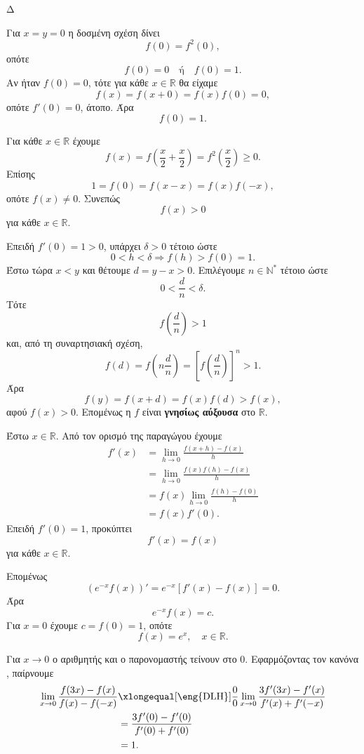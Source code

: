 \begin{thema}{Δ}
\begin{erwthma}
\item Για $x=y=0$ η δοσμένη σχέση δίνει
\[
f(0)=f^2(0),
\]
οπότε
\[
f(0)=0
\quad\text{ή}\quad
f(0)=1.
\]
Αν ήταν $f(0)=0$, τότε για κάθε $x\in\mathbb{R}$ θα είχαμε
\[
f(x)=f(x+0)=f(x)f(0)=0,
\]
οπότε $f'(0)=0$, άτοπο. Άρα
\[
{f(0)=1}.
\]

Για κάθε $x\in\mathbb{R}$ έχουμε
\[
f(x)=f\left(\frac{x}{2}+\frac{x}{2}\right)
=f^2\left(\frac{x}{2}\right)\geq0.
\]
Επίσης
\[
1=f(0)=f(x-x)=f(x)f(-x),
\]
οπότε $f(x)\neq0$. Συνεπώς
\[
{f(x)>0}
\]
για κάθε $x\in\mathbb{R}$.

Επειδή $f'(0)=1>0$, υπάρχει $\delta>0$ τέτοιο ώστε
\[
0<h<\delta\Rightarrow f(h)>f(0)=1.
\]
Έστω τώρα $x<y$ και θέτουμε $d=y-x>0$. Επιλέγουμε $n\in\mathbb{N}^*$ τέτοιο ώστε
\[
0<\frac{d}{n}<\delta.
\]
Τότε
\[
f\left(\frac{d}{n}\right)>1
\]
και, από τη συναρτησιακή σχέση,
\[
f(d)
=f\left(n\frac{d}{n}\right)
=\left[f\left(\frac{d}{n}\right)\right]^n
>1.
\]
Άρα
\[
f(y)=f(x+d)=f(x)f(d)>f(x),
\]
αφού $f(x)>0$. Επομένως η $f$ είναι \textbf{γνησίως αύξουσα} στο $\mathbb{R}$.

\item Έστω $x\in\mathbb{R}$. Από τον ορισμό της παραγώγου έχουμε
\begin{align*}
f'(x)
&=\lim_{h\to0}\frac{f(x+h)-f(x)}{h}\\
&=\lim_{h\to0}
\frac{f(x)f(h)-f(x)}{h}\\
&=f(x)\lim_{h\to0}\frac{f(h)-f(0)}{h}\\
&=f(x)f'(0).
\end{align*}
Επειδή $f'(0)=1$, προκύπτει
\[
{f'(x)=f(x)}
\]
για κάθε $x\in\mathbb{R}$.

Επομένως
\[
\left(e^{-x}f(x)\right)'
=e^{-x}\left[f'(x)-f(x)\right]
=0.
\]
Άρα
\[
e^{-x}f(x)=c.
\]
Για $x=0$ έχουμε $c=f(0)=1$, οπότε
\[
{f(x)=e^x},\quad x\in\mathbb{R}.
\]

\item Για $x\to0$ ο αριθμητής και ο παρονομαστής τείνουν στο $0$. Εφαρμόζοντας τον κανόνα , παίρνουμε
\begin{align*}
\lim_{x\to0}
\frac{f(3x)-f(x)}{f(x)-f(-x)}
&\xlongequal[\text{\eng{DLH}}]{\frac{0}{0}}
\lim_{x\to0}
\frac{3f'(3x)-f'(x)}
{f'(x)+f'(-x)}\\
&=\frac{3f'(0)-f'(0)}
{f'(0)+f'(0)}\\
&={1}.
\end{align*}


\end{erwthma}
\end{thema}
